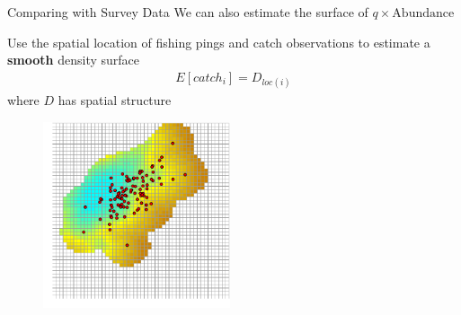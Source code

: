 \documentclass{beamer}
\begin{document}
\begin{frame}{Comparing with Survey Data}
We can also estimate the surface of $q \times \text{Abundance}$
\begin{minipage}{0.4\textwidth}
  \begin{flushright}
    Use the spatial location of fishing pings and catch observations to estimate a \alert{\textbf{smooth}} density surface
    \begin{align*}
      E[catch_i] = D_{loc(i)}  
    \end{align*}
    where $D$ has spatial structure    
  \end{flushright}
\end{minipage}
\hspace{0.5cm}
\begin{minipage}{0.4\textwidth}
  \begin{figure}
    \centering
    \includegraphics[width=5.5cm]{fig6}
  \end{figure}
\end{minipage}
\end{frame}
\end{document}
